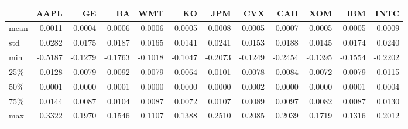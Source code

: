 \begin{tabular}{lrrrrrrrrrrr}
\toprule
{} &    AAPL &      GE &      BA &     WMT &      KO &     JPM &     CVX &     CAH &     XOM &     IBM &    INTC \\
\midrule
mean &  0.0011 &  0.0004 &  0.0006 &  0.0006 &  0.0005 &  0.0008 &  0.0005 &  0.0007 &  0.0005 &  0.0005 &  0.0009 \\
std  &  0.0282 &  0.0175 &  0.0187 &  0.0165 &  0.0141 &  0.0241 &  0.0153 &  0.0188 &  0.0145 &  0.0174 &  0.0240 \\
min  & -0.5187 & -0.1279 & -0.1763 & -0.1018 & -0.1047 & -0.2073 & -0.1249 & -0.2454 & -0.1395 & -0.1554 & -0.2202 \\
25\%  & -0.0128 & -0.0079 & -0.0092 & -0.0079 & -0.0064 & -0.0101 & -0.0078 & -0.0084 & -0.0072 & -0.0079 & -0.0115 \\
50\%  &  0.0001 &  0.0000 &  0.0001 &  0.0000 &  0.0000 &  0.0000 &  0.0002 &  0.0000 &  0.0000 &  0.0001 &  0.0004 \\
75\%  &  0.0144 &  0.0087 &  0.0104 &  0.0087 &  0.0072 &  0.0107 &  0.0089 &  0.0097 &  0.0082 &  0.0087 &  0.0130 \\
max  &  0.3322 &  0.1970 &  0.1546 &  0.1107 &  0.1388 &  0.2510 &  0.2085 &  0.2039 &  0.1719 &  0.1316 &  0.2012 \\
\bottomrule
\end{tabular}
